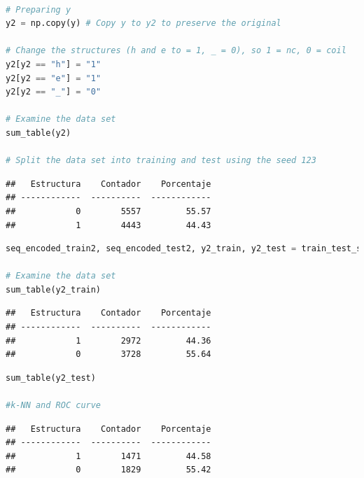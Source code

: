 \documentclass[
]{article}
\begin{document}
\begin{lstlisting}[language=Python]

# Preparing y
y2 = np.copy(y) # Copy y to y2 to preserve the original

# Change the structures (h and e to = 1, _ = 0), so 1 = nc, 0 = coil
y2[y2 == "h"] = "1"
y2[y2 == "e"] = "1"
y2[y2 == "_"] = "0"

# Examine the data set
sum_table(y2)

# Split the data set into training and test using the seed 123
\end{lstlisting}

\begin{lstlisting}
##   Estructura    Contador    Porcentaje
## ------------  ----------  ------------
##            0        5557         55.57
##            1        4443         44.43
\end{lstlisting}

\begin{lstlisting}[language=Python]
seq_encoded_train2, seq_encoded_test2, y2_train, y2_test = train_test_split(seq_encoded, y2 ,test_size=0.33,  random_state=123)

# Examine the data set
sum_table(y2_train)
\end{lstlisting}

\begin{lstlisting}
##   Estructura    Contador    Porcentaje
## ------------  ----------  ------------
##            1        2972         44.36
##            0        3728         55.64
\end{lstlisting}

\begin{lstlisting}[language=Python]
sum_table(y2_test)

#k-NN and ROC curve
\end{lstlisting}

\begin{lstlisting}
##   Estructura    Contador    Porcentaje
## ------------  ----------  ------------
##            1        1471         44.58
##            0        1829         55.42
\end{lstlisting}
\end{document}
